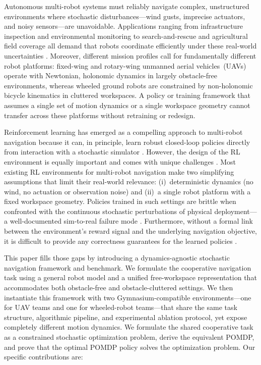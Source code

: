 \documentclass{article}
\begin{document}
Autonomous multi-robot systems must reliably navigate complex, unstructured environments where stochastic disturbances---wind gusts, imprecise actuators, and noisy sensors---are unavoidable. Applications ranging from infrastructure inspection and environmental monitoring to search-and-rescue and agricultural field coverage all demand that robots coordinate efficiently under these real-world uncertainties \citep{dulacArnold2021, fan2020ijrr}. Moreover, different mission profiles call for fundamentally different robot platforms: fixed-wing and rotary-wing unmanned aerial vehicles~(UAVs) operate with Newtonian, holonomic dynamics in largely obstacle-free environments, whereas wheeled ground robots are constrained by non-holonomic bicycle kinematics in cluttered workspaces. A policy or training framework that assumes a single set of motion dynamics or a single workspace geometry cannot transfer across these platforms without retraining or redesign.

Reinforcement learning has emerged as a compelling approach to multi-robot navigation because it can, in principle, learn robust closed-loop policies directly from interaction with a stochastic simulator \citep{chen2017icra, everett2018iros, fan2020ijrr}. However, the design of the RL environment is equally important and comes with unique challenges \citep{reda2020learning, dulac2020empirical, jakub2023as, henderson2018deep, sutton2018reinforcement}. Most existing RL environments for multi-robot navigation make two simplifying assumptions that limit their real-world relevance: (i)~deterministic dynamics (no wind, no actuation or observation noise) and (ii)~a single robot platform with a fixed workspace geometry. Policies trained in such settings are brittle when confronted with the continuous stochastic perturbations of physical deployment---a well-documented sim-to-real failure mode \citep{dulacArnold2021, tobin2017domain}. Furthermore, without a formal link between the environment's reward signal and the underlying navigation objective, it is difficult to provide any correctness guarantees for the learned policies \citep{jakub2023as}.

This paper fills those gaps by introducing a dynamics-agnostic stochastic navigation framework and benchmark. We formulate the cooperative navigation task using a general robot model and a unified free-workspace representation that accommodates both obstacle-free and obstacle-cluttered settings. We then instantiate this framework with two Gymnasium-compatible environments---one for UAV teams and one for wheeled-robot teams---that share the same task structure, algorithmic pipeline, and experimental ablation protocol, yet expose completely different motion dynamics. We formulate the shared cooperative task as a constrained stochastic optimization problem, derive the equivalent POMDP, and prove that the optimal POMDP policy solves the optimization problem. Our specific contributions are:
\end{document}

